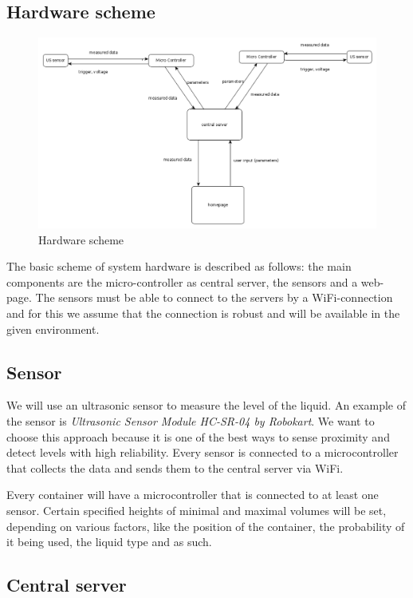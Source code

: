 \documentclass{article}
\begin{document}
\subsection{Hardware scheme}

\begin{figure}
\label{scheme}
\includegraphics[scale=3.5]{images/circuit.png}
\caption{Hardware scheme}
\end{figure}

The basic scheme of system hardware is described as follows: the main components
are the micro-controller as central server, the sensors and a web-page. The
sensors must be able to connect to the servers by a WiFi-connection and for this
we assume that the connection is robust and will be available in the given
environment. \par
\FloatBarrier
\subsection{Sensor}
We will use an ultrasonic sensor to measure the level of the liquid. An example of the sensor is \textit{Ultrasonic Sensor Module HC-SR-04 by Robokart}. 
We want to choose this approach because it is one of the best ways to sense proximity and detect levels with high reliability. Every sensor is connected to a microcontroller 
that collects the data and sends them to the central server via WiFi.  

Every container will have a microcontroller that is connected to at least one sensor. 
Certain specified heights of minimal and maximal volumes will be set, depending
on various factors, like the position of the container, the probability of it being used, 
the liquid type and as such.

\subsection{Central server}
\end{document}
